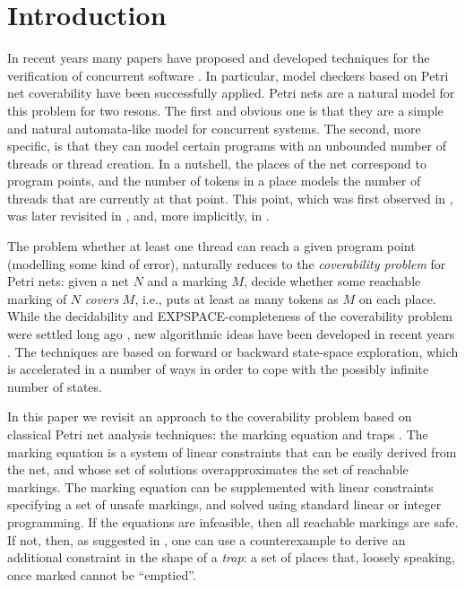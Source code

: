 \section{Introduction}

In recent years many papers have proposed and developed techniques for
the verification of concurrent software
\cite{KaiserKW10,GantyM12,BouajjaniEmmi12,KaiserKWCONCUR12,DOsualdoSAS13}.
In particular, model checkers based on Petri net coverability have been successfully
applied.  Petri nets are a natural model for this problem for two
resons.  The first and obvious one is that they are a simple and
natural automata-like model for concurrent systems. The second, more
specific, is that they can model certain programs with an unbounded
number of threads or thread creation. In a nutshell, the places of the
net correspond to program points, and the number of tokens in a place
models the number of threads that are currently at that point. This
point, which was first observed in \cite{GS92}, was later revisited in
\cite{DelzannoRB02}, and, more implicitly, in \cite{KaiserKW10}.

The problem whether at least one thread can reach a given program
point (modelling some kind of error), naturally reduces to the {\em
  coverability problem} for Petri nets: given a net $N$ and a marking
$M$, decide whether some reachable marking of $N$ {\em covers} $M$,
i.e., puts at least as many tokens as $M$ on each place. While the
decidability and EXPSPACE-completeness of the coverability problem
were settled long ago \cite{KarpM69,Rackoff78}, new algorithmic ideas
have been developed in recent years
\cite{GeeraertsRB06,GantyFI08,ValmariH12,KaiserKWCONCUR12,KloosMNP13}. 
The techniques are based on forward or backward state-space exploration, 
which is accelerated in a number of ways in order to cope with the possibly 
infinite number of states.

In this paper we revisit an approach to the coverability problem based
on classical Petri net analysis techniques: the marking equation and
traps \cite{murata1989petri,EsparzaM00,Reisig13}.
The marking equation is a system of linear constraints that can be
easily derived from the net, and whose set of solutions
overapproximates the set of reachable markings.  The marking equation
can be supplemented with linear constraints specifying a set of unsafe
markings, and solved using standard linear or integer programming. If
the equations are infeasible, then all reachable markings are safe. If
not, then, as suggested in \cite{EsparzaM00}, one can use a
counterexample to derive an additional constraint in the shape of a
{\em trap}: a set of places that, loosely speaking, once marked cannot
be ``emptied''.

